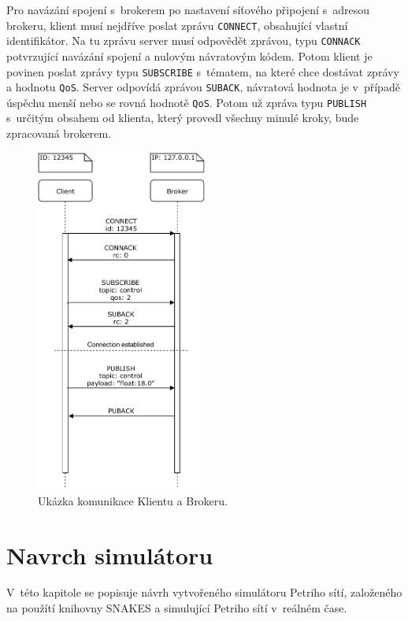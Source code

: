 Pro navázání spojení s~brokerem po nastavení síťového připojení s~adresou brokeru, klient musí nejdříve poslat zprávu \texttt{CONNECT}, obsahující vlastní identifikátor. Na tu zprávu server musí odpovědět zprávou,  typu \texttt{CONNACK} potvrzující navázání spojení a nulovým návratovým kódem. Potom klient je povinen poslat zprávy typu \texttt{SUBSCRIBE} s~tématem, na které chce dostávat zprávy a hodnotu \texttt{QoS}. Server odpovídá zprávou \texttt{SUBACK}, návratová hodnota je v~případě úspěchu menší nebo se rovná  hodnotě \texttt{QoS}. Potom už zpráva typu \texttt{PUBLISH} s~určitým obsahem od klienta, který provedl všechny minulé kroky, bude zpracovaná brokerem.

\begin{figure}[hbt]
 \centering
 \includegraphics[width=0.5\textwidth]{obrazky-figures/MQTT-flow.pdf}
 \caption{Ukázka komunikace Klientu a Brokeru.}
 \label{mqtt-flow}
\end{figure}

\chapter{Navrch simulátoru}
\label{chap:arch-simul}

V~této kapitole se popisuje návrh vytvořeného simulátoru Petriho sítí, založeného na použítí knihovny SNAKES a simulující Petriho sítí v~reálném čase.

